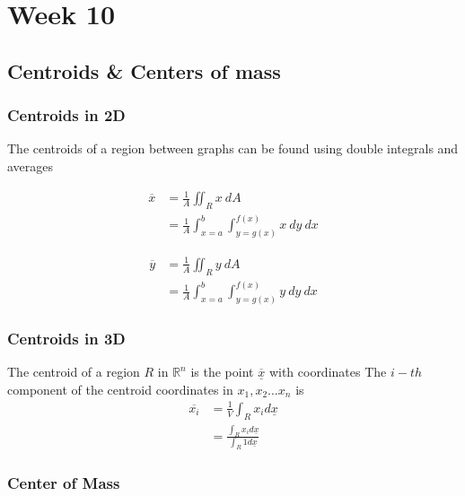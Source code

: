 \chapter{Week 10}

\section{Centroids \& Centers of mass}

\subsection{Centroids in 2D}

\begin{framed}
   The centroids of a region between graphs can be found using double integrals and averages

   \begin{align*}
      \overline{x} &= \frac{1}{A} \iint_{R} x\ dA  \\
                   &= \frac{1}{A} \int_{x=a}^{b} \int_{y=g(x)}^{f(x)} x\ dy\ dx
   \end{align*}
  
   \begin{align*}
      \overline{y} &= \frac{1}{A} \iint_{R} y\ dA  \\
                   &= \frac{1}{A} \int_{x=a}^{b} \int_{y=g(x)}^{f(x)} y\ dy\ dx
   \end{align*}
\end{framed}

\subsection{Centroids in 3D}
\begin{framed}

   The centroid of a region $R$ in $ \mathbb{R}^n$ is the point $ \overline{ \underline{x}} $ with coordinates
   The $i-th$ component of the centroid coordinates in $x_1, x_2 \hdots x_n$ is
   \begin{align*}
      \overline{x_i} &= \frac{1}{V} \int_R x_i d \underline{x} \\
                     &= \frac{\int_R x_i d \underline{x} }{\int_R 1 d \underline{x}}
   \end{align*}
\end{framed}

\subsection{Center of Mass}

